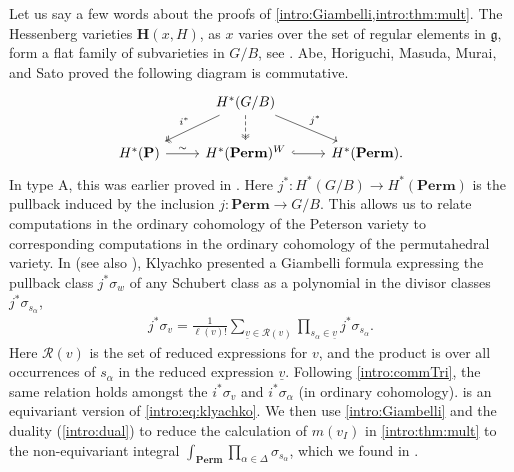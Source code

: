 \documentclass[10pt]{article}
\numberwithin{thm}{section}
\theoremstyle{definition}
\theoremstyle{remark}
\newcommand{\Pet}{\ensuremath{\mathbf{P}}}
\newcommand{\Perm}{\ensuremath{\mathbf{Perm}}}
\newcommand{\Fl}{\ensuremath{G/B}}
\newcommand{\Hess}{\mathbf H}
\begin{document}
Let us say a few words about the proofs of \cref{intro:Giambelli,intro:thm:mult}.
The Hessenberg varieties $\Hess(x,H)$,
as $x$ varies over the set of regular elements in $\mathfrak g$,
form a flat family of subvarieties in $G/B$,
see \cite[Prop. 6.1]{abe.fujita.zeng}.
Abe, Horiguchi, Masuda, Murai, and Sato \cite{MR4116638} proved the following diagram is commutative.
\begin{equation}
\label{intro:commTri}
\begin{tikzcd}
&H^*(\Fl)\arrow[dl,swap,"i^*",twoheadrightarrow]\arrow[d,twoheadrightarrow,dashed]\arrow[dr,"j^*"]&\\
H^*(\Pet)\arrow[r,"\sim"]&H^*(\Perm)^W\arrow[hook,r]&H^*(\Perm).
\end{tikzcd}
\end{equation}
In type A, this was earlier proved in \cite{ahhm:cohomologyring}.
Here $j^*:H^*(G/B)\to H^*(\Perm)$ is the pullback induced by the inclusion $j:\Perm\to G/B$.
This allows us to relate computations in the ordinary cohomology of the Peterson variety
to corresponding computations in the ordinary cohomology of the permutahedral variety.
In \cite{klyachko85,klyachko95} (see also \cite{nadeau.tewari}),
Klyachko presented a Giambelli formula expressing the pullback class
$j^*\sigma_w$ of any Schubert class as a polynomial in the divisor classes $j^*\sigma_{s_\alpha}$,
\begin{align}
\label{intro:eq:klyachko}
j^*\sigma_v=\frac{1}{\ell(v)!}\sum_{\underline v\in\mathcal R(v)}\prod_{s_\alpha\in\underline v}j^*\sigma_{s_\alpha}.
\end{align}
Here $\mathcal R(v)$ is the set of reduced expressions for $v$,
and the product is over all occurrences of $s_\alpha$ in the reduced expression $\underline v$.
Following \cref{intro:commTri}, the same relation holds amongst the $i^*\sigma_v$ and $i^*\sigma_\alpha$ (in ordinary cohomology).
 is an equivariant version of \cref{intro:eq:klyachko}.
We then use \cref{intro:Giambelli} and the duality (\cref{intro:dual}) 
to reduce the calculation of $m(v_I)$ in \cref{intro:thm:mult} to the non-equivariant integral 
$\int_\Perm\prod_{\alpha\in\Delta}\sigma_{s_\alpha}$,
which we found in \cite{klyachko85}.
\end{document}
